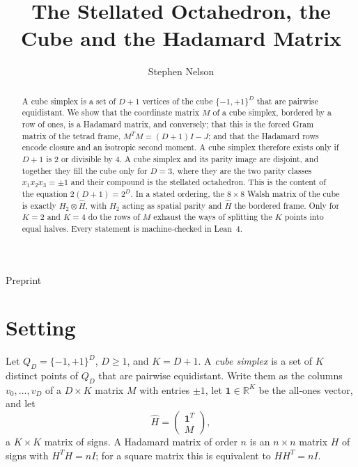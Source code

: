 \documentclass[twocolumn]{iopjournal}
\renewcommand{\articletype}[1]{%
  {\vspace*{-8mm}\noindent \Large \sf Preprint}\par
  \vspace*{6mm}\noindent{\scriptsize \sf{\bfseries \MakeUppercase{#1}}}}
\begin{document}
\articletype{Supplementary Material}

\title{The Stellated Octahedron, the Cube and the Hadamard Matrix}

\author{Stephen Nelson}



\begin{abstract}
A cube simplex is a set of $D + 1$ vertices of the cube
$\{-1,+1\}^D$ that are pairwise equidistant. We show that the
coordinate matrix $M$ of a cube simplex, bordered by a row of ones,
is a Hadamard matrix, and conversely; that this is the forced Gram
matrix of the tetrad frame, $M^TM = (D+1)I - J$; and that the
Hadamard rows encode closure and an isotropic second moment. A cube
simplex therefore exists only if $D + 1$ is $2$ or divisible by $4$.
A cube simplex and its parity image are disjoint, and together they
fill the cube only for $D = 3$, where they are the two parity
classes $x_1x_2x_3 = \pm1$ and their compound is the stellated
octahedron. This is the content of the equation $2(D+1) = 2^D$. In a
stated ordering, the $8 \times 8$ Walsh matrix of the cube is exactly
$H_2 \otimes \hat H$, with $H_2$ acting as spatial parity and
$\hat H$ the bordered frame. Only for $K = 2$ and $K = 4$ do the rows
of $M$ exhaust the ways of splitting the $K$ points into equal halves.
Every statement is machine-checked in Lean~4.
\end{abstract}



\section*{Setting}

Let $Q_D = \{-1,+1\}^D$, $D \ge 1$, and $K = D + 1$. A \emph{cube
simplex} is a set of $K$ distinct points of $Q_D$ that are pairwise
equidistant. Write them as the columns $v_0, \dots, v_D$ of a
$D \times K$ matrix $M$ with entries $\pm1$, let
$\mathbf{1} \in \mathbb{R}^K$ be the all-ones vector, and let
\begin{equation}
  \hat H = \begin{pmatrix} \mathbf{1}^T \\ M \end{pmatrix},
  \label{eq:Hhat}
\end{equation}
a $K \times K$ matrix of signs. A Hadamard matrix of order $n$ is an
$n \times n$ matrix $H$ of signs with $H^TH = nI$; for a square
matrix this is equivalent to $HH^T = nI$.
\end{document}
